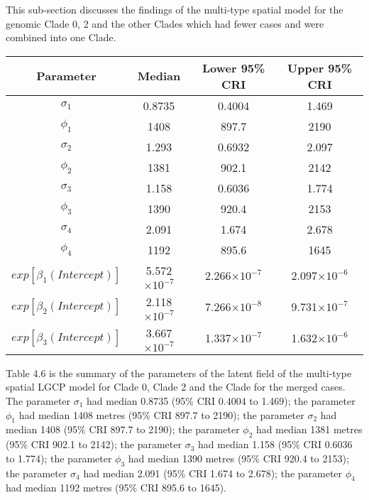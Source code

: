 \documentclass[a4paper]{thesis}
\begin{document}
This sub-section discusses the findings of the multi-type spatial model for the genomic Clade 0, 2 and the other Clades which had fewer cases and were combined into one Clade.

\begin{table}[h]
    \centering
    \begin{tabular}{cccc}
         \toprule
         Parameter & Median & Lower 95\% CRI & Upper 95\% CRI \\ \midrule
        $\sigma_1$ & 0.8735 & 0.4004 & 1.469 \\
        $\phi_1$ & 1408 & 897.7 & 2190 \\
        $\sigma_2$ & 1.293 & 0.6932 & 2.097 \\
        $\phi_2$ & 1381 & 902.1 & 2142 \\
        $\sigma_3$ & 1.158 & 0.6036 & 1.774 \\
        $\phi_3$ & 1390 & 920.4 & 2153 \\
        $\sigma_4$ & 2.091 & 1.674 & 2.678 \\
        $\phi_4$ & 1192 & 895.6 & 1645 \\
        $exp[\beta_1(Intercept)]$ & 5.572$\times10^{-7}$ & 2.266$\times10^{-7}$ & 2.097$\times10^{-6}$ \\
        $exp[\beta_2(Intercept)]$ & 2.118$\times10^{-7}$ & 7.266$\times10^{-8}$ & 9.731$\times10^{-7}$ \\
        $exp[\beta_3(Intercept)]$ & 3.667$\times10^{-7}$ & 1.337$\times10^{-7}$ & 1.632$\times10^{-6}$ \\
         \bottomrule
    \end{tabular}
\end{table}

Table 4.6 is the summary of the parameters of the latent field of the multi-type spatial LGCP model for Clade 0, Clade 2 and the Clade for the merged cases. The parameter $\sigma_1$ had median 0.8735 (95\% CRI 0.4004 to 1.469); the parameter $\phi_1$ had median 1408 metres (95\% CRI 897.7 to 2190); the parameter $\sigma_2$ had median 1408 (95\% CRI 897.7 to 2190); the parameter $\phi_2$ had median 1381 metres (95\% CRI 902.1 to 2142); the parameter $\sigma_3$ had median 1.158 (95\% CRI 0.6036 to 1.774); the parameter $\phi_3$ had median 1390 metres (95\% CRI 920.4 to 2153); the parameter $\sigma_4$ had median 2.091 (95\% CRI 1.674 to 2.678); the parameter $\phi_4$ had median 1192 metres (95\% CRI 895.6 to 1645). 
\end{document}
